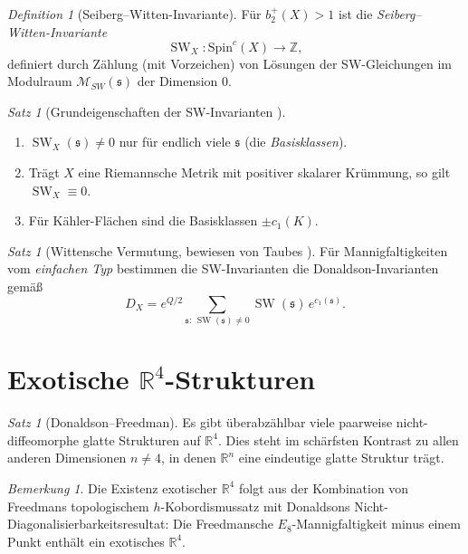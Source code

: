 \documentclass[12pt,a4paper]{amsart}
\theoremstyle{definition}
\theoremstyle{remark}
\newtheorem{satz}[theorem]{Satz}
\newtheorem{bemerkung}[theorem]{Bemerkung}
\newtheorem{definition_de}[theorem]{Definition}
\DeclareMathOperator{\SW}{SW}
\newcommand{\ZZ}{\mathbb{Z}}
\newcommand{\RR}{\mathbb{R}}
\begin{document}
\begin{definition_de}[Seiberg--Witten-Invariante]
Für $b_2^+(X) > 1$ ist die \emph{Seiberg--Witten-Invariante}
\[
  \SW_X \colon \mathrm{Spin}^c(X) \longrightarrow \ZZ,
\]
definiert durch Zählung (mit Vorzeichen) von Lösungen der SW-Gleichungen
im Modulraum $\mathcal{M}_{SW}(\mathfrak{s})$ der Dimension 0.
\end{definition_de}

\begin{satz}[Grundeigenschaften der SW-Invarianten \cite{Witten1994SW}]
\begin{enumerate}[label=(\roman*)]
  \item $\SW_X(\mathfrak{s}) \neq 0$ nur für endlich viele $\mathfrak{s}$
        (die \emph{Basisklassen}).
  \item Trägt $X$ eine Riemannsche Metrik mit positiver skalarer Krümmung,
        so gilt $\SW_X \equiv 0$.
  \item Für Kähler-Flächen sind die Basisklassen $\pm c_1(K)$.
\end{enumerate}
\end{satz}

\begin{satz}[Wittensche Vermutung, bewiesen von Taubes \cite{Taubes1994}]
Für Mannigfaltigkeiten vom \emph{einfachen Typ} bestimmen die
SW-Invarianten die Donaldson-Invarianten gemäß
\[
  D_X = e^{Q/2} \sum_{\mathfrak{s}:\,\SW(\mathfrak{s})\neq 0} \SW(\mathfrak{s})\,
        e^{c_1(\mathfrak{s})}.
\]
\end{satz}

\section{Exotische $\RR^4$-Strukturen}

\begin{satz}[Donaldson--Freedman]
Es gibt überabzählbar viele paarweise nicht-diffeomorphe glatte Strukturen
auf $\RR^4$.  Dies steht im schärfsten Kontrast zu allen anderen Dimensionen
$n \neq 4$, in denen $\RR^n$ eine eindeutige glatte Struktur trägt.
\end{satz}

\begin{bemerkung}
Die Existenz exotischer $\RR^4$ folgt aus der Kombination von Freedmans
topologischem $h$-Kobordismussatz mit Donaldsons Nicht-Diagonalisierbarkeits\-resultat:
Die Freedmansche $E_8$-Mannigfaltigkeit minus einem Punkt enthält ein
exotisches $\RR^4$.
\end{bemerkung}
\end{document}
